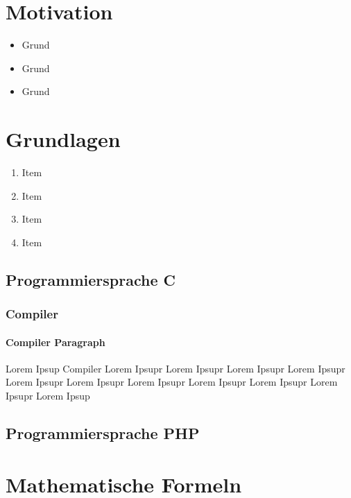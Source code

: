 \documentclass[12pt,a4paper]{article}
\author{Thilo}
\begin{document}
\section{Motivation}
\begin{itemize}
\item Grund
\item Grund
\item Grund
\end{itemize}

\section{Grundlagen}
\begin{enumerate}
\item Item
\item Item
\item Item
\item Item
\end{enumerate}

\subsection{Programmiersprache C}

\subsubsection{Compiler}

\paragraph{Compiler Paragraph} Lorem Ipsup Compiler Lorem Ipsupr Lorem Ipsupr Lorem Ipsupr Lorem Ipsupr Lorem Ipsupr Lorem Ipsupr Lorem Ipsupr Lorem Ipsupr Lorem Ipsupr Lorem Ipsupr Lorem Ipsup

\subsection{Programmiersprache PHP}
\section{Mathematische Formeln}
\end{document}
